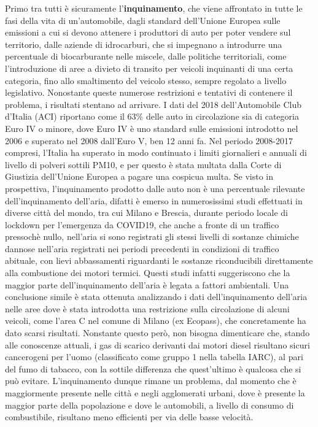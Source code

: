 Primo tra tutti è sicuramente l'\textbf{inquinamento}, che viene affrontato in tutte le fasi della vita di un'automobile, dagli standard dell'Unione Europea sulle emissioni a cui si devono attenere i produttori di auto per poter vendere sul territorio, dalle aziende di idrocarburi, che si impegnano a introdurre una percentuale di biocarburante nelle miscele, dalle politiche territoriali, come l'introduzione di aree a divieto di transito per veicoli inquinanti di una certa categoria, fino allo smaltimento del veicolo stesso, sempre regolato a livello legislativo. Nonostante queste numerose restrizioni e tentativi di contenere il problema, i risultati stentano ad arrivare. I dati del 2018 dell'Automobile Club d'Italia (ACI) riportano come il 63\% delle auto in circolazione sia di categoria Euro IV o minore\cite{anfiastudiestatistiche}, dove Euro IV è uno standard sulle emissioni introdotto nel 2006 e superato nel 2008 dall'Euro V, ben 12 anni fa\cite{euroivstandard}. Nel periodo 2008-2017 compresi, l'Italia ha superato in modo continuato i limiti giornalieri e annuali di livello di polveri sottili PM10, e per questo è stata multata dalla Corte di Giustizia dell'Unione Europea a pagare una cospicua multa\cite{eunewssanzioneitalia}. Se visto in prospettiva, l'inquinamento prodotto dalle auto non è una percentuale rilevante dell'inquinamento dell'aria, difatti è emerso in numerosissimi studi effettuati in diverse città del mondo, tra cui Milano e Brescia\cite{collivignarelli2020}\cite{camaletti2020}, durante periodo locale di lockdown per l'emergenza da COVID19, che anche a fronte di un traffico pressochè nullo, nell'aria si sono registrati gli stessi livelli di sostanze chimiche dannose nell'aria registrati nei periodi precedenti in condizioni di traffico abituale, con lievi abbassamenti riguardanti le sostanze riconducibili direttamente alla combustione dei motori termici. Questi studi infatti suggeriscono che la maggior parte dell'inquinamento dell'aria è legata a fattori ambientali. Una conclusione simile è stata ottenuta analizzando i dati dell'inquinamento dell'aria nelle aree dove è stata introdotta una restrizione sulla circolazione di alcuni veicoli, come l'area C nel comune di Milano (ex Ecopass), che concretamente ha dato scarsi risultati\cite{trentini2014}. Nonstante questo però, non bisogna dimenticare che, stando alle conoscenze attuali, i gas di scarico derivanti dai motori diesel risultano sicuri cancerogeni per l'uomo (classificato come gruppo 1 nella tabella IARC), al pari del fumo di tabacco, con la sottile differenza che quest'ultimo è qualcosa che si può evitare\cite{iarctable}. L'inquinamento dunque rimane un problema, dal momento che è maggiormente presente nelle città e negli agglomerati urbani, dove è presente la maggior parte della popolazione e dove le automobili, a livello di consumo di combustibile, risultano meno efficienti per via delle basse velocità.

